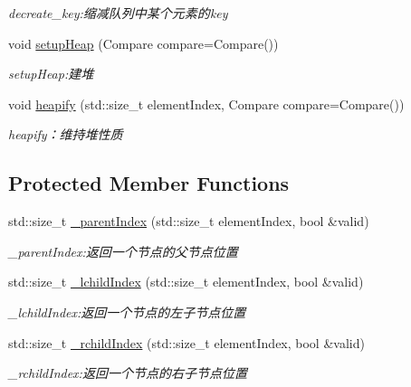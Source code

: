 \begin{DoxyCompactItemize}
\begin{DoxyCompactList}\small\item\em decreate\+\_\+key\+:缩减队列中某个元素的{\ttfamily key} \end{DoxyCompactList}\item 
void \hyperlink{class_introduction_to_algorithm_1_1_queue_algorithm_1_1_min_queue_a50e106d8a3062490328588593181a6ee}{setup\+Heap} (Compare compare=Compare())
\begin{DoxyCompactList}\small\item\em setup\+Heap\+:建堆 \end{DoxyCompactList}\item 
void \hyperlink{class_introduction_to_algorithm_1_1_queue_algorithm_1_1_min_queue_ae06cfa4dbe4464586b498b15f36081c8}{heapify} (std\+::size\+\_\+t element\+Index, Compare compare=Compare())
\begin{DoxyCompactList}\small\item\em heapify：维持堆性质 \end{DoxyCompactList}\end{DoxyCompactItemize}
\subsection*{Protected Member Functions}
\begin{DoxyCompactItemize}
\item 
std\+::size\+\_\+t \hyperlink{class_introduction_to_algorithm_1_1_queue_algorithm_1_1_min_queue_a88390bf1df0ffcff26ac91f470fb587b}{\+\_\+parent\+Index} (std\+::size\+\_\+t element\+Index, bool \&valid)
\begin{DoxyCompactList}\small\item\em \+\_\+parent\+Index\+:返回一个节点的父节点位置 \end{DoxyCompactList}\item 
std\+::size\+\_\+t \hyperlink{class_introduction_to_algorithm_1_1_queue_algorithm_1_1_min_queue_a613d6ac06a5663dff135e2df36c4e42c}{\+\_\+lchild\+Index} (std\+::size\+\_\+t element\+Index, bool \&valid)
\begin{DoxyCompactList}\small\item\em \+\_\+lchild\+Index\+:返回一个节点的左子节点位置 \end{DoxyCompactList}\item 
std\+::size\+\_\+t \hyperlink{class_introduction_to_algorithm_1_1_queue_algorithm_1_1_min_queue_af92770f4e79a6703c2c21107b3ce8d9d}{\+\_\+rchild\+Index} (std\+::size\+\_\+t element\+Index, bool \&valid)
\begin{DoxyCompactList}\small\item\em \+\_\+rchild\+Index\+:返回一个节点的右子节点位置 \end{DoxyCompactList}\end{DoxyCompactItemize}
